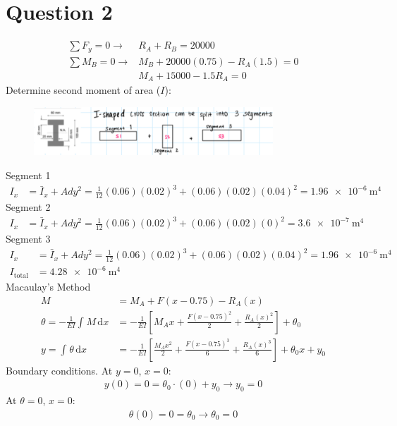 \documentclass[11pt]{article}
\numberwithin{equation}{section}
\begin{document}
\section{Question 2}
\begin{align}
  \sum F_y = 0 \rightarrow &R_A + R_B = 20000 \label{Q1Eq1}\\
  \sum M_B = 0 \rightarrow &M_B + 20000(0.75) - R_A(1.5) = 0\\
  & M_A + 15000 - 1.5 R_A = 0 \label{Q1Eq2}
\end{align}
Determine second moment of area ($I$):
\begin{figure}[H]
  \centering
  \includegraphics[width = 0.8\textwidth]{./img/SecondMomentOfInertiaQ2.png}
\end{figure}
Segment 1
\begin{align}
  I_x &= \bar{I}_x + Ady^2 = \frac{1}{12}(0.06)(0.02)^3 + (0.06)(0.02)(0.04)^2 = \SI{1.96e-6}{\meter\tothe{4}}
\end{align}
Segment 2
\begin{align}
  I_x &= \bar{I}_x + Ady^2 = \frac{1}{12}(0.06)(0.02)^3 + (0.06)(0.02)(0)^2 = \SI{3.6e-7}{\meter\tothe{4}}
\end{align}
Segment 3
\begin{align}
  I_x &= \bar{I}_x + Ady^2 = \frac{1}{12} (0.06)(0.02)^3 + (0.06)(0.02)(0.04)^2 = \SI{1.96e-6}{\meter\tothe{4}}\\
  I_{\textrm{total}} &= \SI{4.28e-6}{\meter\tothe{4}}
\end{align}
Macaulay's Method
\begin{align}
  M &= M_A + F(x-0.75) - R_A(x)\\
  \theta = -\frac{1}{EI} \int_{}^{} M \,\mathrm{d}x &= -\frac{1}{EI} \left[ M_A x + \frac{F(x-0.75)^2}{2} + \frac{R_A(x)^2}{2} \right] + \theta_0\\
  y = \int_{}^{} \theta \,\mathrm{d}x &= -\frac{1}{EI} \left[ \frac{M_Ax^2}{2} + \frac{F(x-0.75)^3}{6} + \frac{R_A (x)^3}{6} \right] + \theta_0 x + y_0
\end{align}
Boundary conditions. At $y= 0$, $x=0$:
\begin{align}
  y(0) = 0 = \theta_0 \cdot (0) + y_0 \rightarrow y_0 = 0
\end{align}
At $\theta = 0$, $x=0$:
\begin{align}
  \theta (0) = 0 = \theta_0 \rightarrow \theta_0 = 0  
\end{align}
\end{document}
